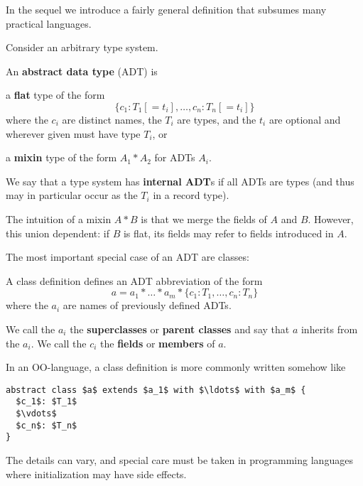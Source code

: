 In the sequel we introduce a fairly general definition that subsumes many practical languages.

\begin{definition}
Consider an arbitrary type system.

An \textbf{abstract data type} (ADT) is
\begin{compactitem}
\item a \textbf{flat} type of the form
  \[\{c_1:T_1[=t_i],\ldots,c_n:T_n[=t_i]\}\]
  where the $c_i$ are distinct names, the $T_i$ are types, and the $t_i$ are optional and wherever given must have type $T_i$, or
\item a \textbf{mixin} type of the form $A_1*A_2$ for ADTs $A_i$.
\end{compactitem}

We say that a type system has \textbf{internal ADT}s if all ADTs are types (and thus may in particular occur as the $T_i$ in a record type).
\end{definition}

The intuition of a mixin $A*B$ is that we merge the fields of $A$ and $B$.
However, this union dependent: if $B$ is flat, its fields may refer to fields introduced in $A$.

The most important special case of an ADT are classes:

\begin{definition}[Class]
A class definition defines an ADT abbreviation of the form
\[a = a_1*\ldots*a_m*\{c_1:T_1,\ldots,c_n:T_n\}\]
where the $a_i$ are names of previously defined ADTs.

We call the $a_i$ the \textbf{superclasses} or \textbf{parent classes} and say that $a$ inherits from the $a_i$.
We call the $c_i$ the \textbf{fields} or \textbf{members} of $a$.
\end{definition}

In an OO-language, a class definition is more commonly written somehow like
\begin{lstlisting}
abstract class $a$ extends $a_1$ with $\ldots$ with $a_m$ {
  $c_1$: $T_1$
  $\vdots$
  $c_n$: $T_n$
}
\end{lstlisting}
The details can vary, and special care must be taken in programming languages where initialization may have side effects.


